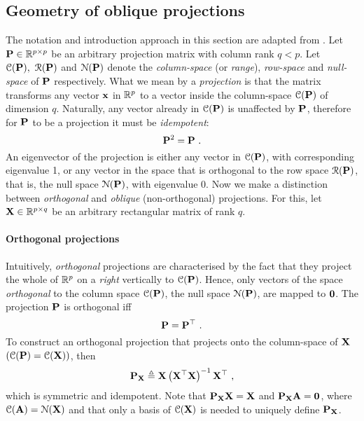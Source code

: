 
    \subsection{Geometry of oblique projections} \label{subsec:app1_oblique_projection}
      The notation and introduction approach in this section are adapted from \citep{Behrens:signal94}.
      Let $\mathbf{P} \in \mathbb{R}^{p \times p}$ be an arbitrary projection matrix with column rank $q < p$. Let $\mathcal{C}(\mathbf{P}),~\mathcal{R}(\mathbf{P})$ and $\mathcal{N}(\mathbf{P})$ denote the \textit{column-space} (or \textit{range}), \textit{row-space} and \textit{null-space} of $\mathbf{P}$ respectively. What we mean by a \textit{projection} is that the matrix transforms any vector $\mathbf{x}$ in $\mathbb{R}^p$ to a vector inside the column-space $\mathcal{C}(\mathbf{P})$ of dimension $q$. Naturally, any vector already in $\mathcal{C}(\mathbf{P})$ is unaffected by $\mathbf{P}$, therefore for $\mathbf{P}$ to be a projection it must be \textit{idempotent}:
      \[
	\mathbf{P}^2 = \mathbf{P} ~.
      \]
      An eigenvector of the projection is either any vector in $\mathcal{C}(\mathbf{P})$, with corresponding eigenvalue 1, or any vector in the space that is orthogonal to the row space $\mathcal{R}(\mathbf{P})$, that is, the null space $\mathcal{N}(\mathbf{P})$, with eigenvalue 0. Now we make a distinction between \textit{orthogonal} and \textit{oblique} (non-orthogonal) projections. For this, let $\mathbf{X} \in \mathbb{R}^{p \times q}$ be an arbitrary rectangular matrix of rank $q$.

      \paragraph{Orthogonal projections} Intuitively, \textit{orthogonal} projections are characterised by the fact that they project the whole of $\mathbb{R}^p$ on a \emph{right} vertically to $\mathcal{C}(\mathbf{P})$. Hence, only vectors of the space \emph{orthogonal} to the column space $\mathcal{C}(\mathbf{P})$, the null space $\mathcal{N}(\mathbf{P})$, are mapped to $\mathbf{0}$. %
      The projection $\mathbf{P}$ is orthogonal iff
      \[
	\mathbf{P} = \mathbf{P}^\top ~.
      \]
      To construct an orthogonal projection that projects onto the column-space of $\mathbf{X}$ $(\mathcal{C}(\mathbf{P}) = \mathcal{C}(\mathbf{X}))$, then
      \[
	\mathbf{P}_{\mathbf{X}} \triangleq \mathbf{X} \left( \mathbf{X}^\top \mathbf{X} \right)^{-1} \mathbf{X}^\top ~,
      \]
      which is symmetric and idempotent. Note that $\mathbf{P}_{\mathbf{X}}\mathbf{X} = \mathbf{X}$ and $\mathbf{P}_{\mathbf{X}}\mathbf{A} = \mathbf{0}$, where $\mathcal{C}(\mathbf{A}) = \mathcal{N}(\mathbf{X})$ and that only a basis of $\mathcal{C}(\mathbf{X})$ is needed to uniquely define $\mathbf{P}_{\mathbf{X}}$.

